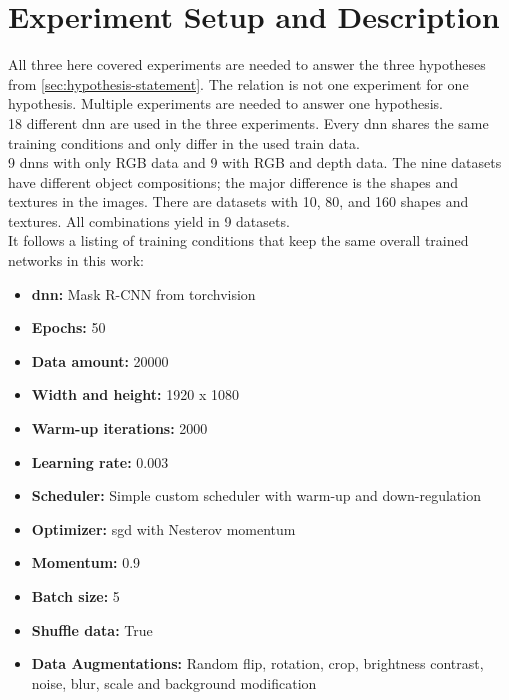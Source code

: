 \chapter{Experiment Setup and Description}
\label{chap:kapitel4}

	All three here covered experiments are needed to answer the three hypotheses from \ref{sec:hypothesis-statement}. The relation is not one experiment for one hypothesis. Multiple experiments are needed to answer one hypothesis.\\
	18 different \acl{dnn} are used in the three experiments. Every \ac{dnn} shares the same training conditions and only differ in the used train data.\\
	9 \ac{dnn}s with only RGB data and 9 with RGB and depth data. The nine datasets have different object compositions; the major difference is the shapes and textures in the images. There are datasets with 10, 80, and 160 shapes and textures. All combinations yield in 9 datasets.\\
	It follows a listing of training conditions that keep the same overall trained networks in this work:
	\begin{itemize}
		\item \textbf{\ac{dnn}:} Mask R-CNN from torchvision
		\item \textbf{Epochs:} 50
		\item \textbf{Data amount:} 20000
		\item \textbf{Width and height:} 1920 x 1080
		\item \textbf{Warm-up iterations:} 2000
		\item \textbf{Learning rate:} 0.003
		\item \textbf{Scheduler:} Simple custom scheduler with warm-up and down-regulation
		\item \textbf{Optimizer:} \acl{sgd} with Nesterov momentum \cite{Botev2016}
		\item \textbf{Momentum:} 0.9
		\item \textbf{Batch size:} 5
		\item \textbf{Shuffle data:} True
		\item \textbf{Data Augmentations:} Random flip, rotation, crop, brightness contrast, noise, blur, scale and background modification
	\end{itemize}
	
	
	
